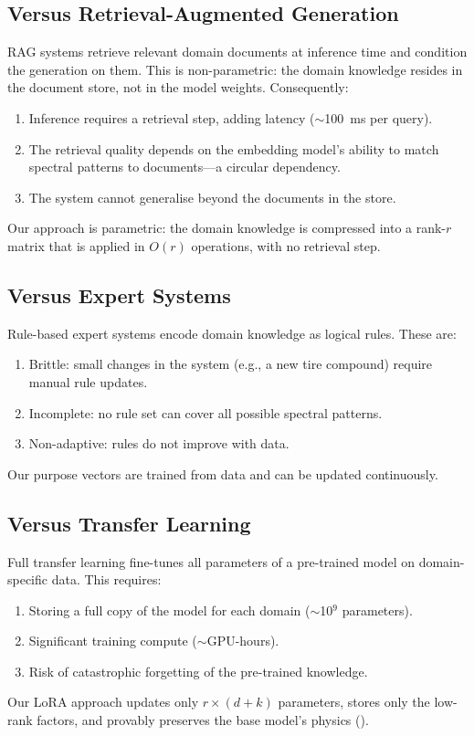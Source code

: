 \documentclass[11pt,twocolumn,a4paper]{article}
\theoremstyle{definition}
\theoremstyle{remark}
\begin{document}
\subsection{Versus Retrieval-Augmented Generation}

RAG systems \citep{gururangan2020dont} retrieve relevant domain documents at inference time and condition the generation on them.  This is non-parametric: the domain knowledge resides in the document store, not in the model weights.  Consequently:
\begin{enumerate}
    \item Inference requires a retrieval step, adding latency ($\sim$100~ms per query).
    \item The retrieval quality depends on the embedding model's ability to match spectral patterns to documents---a circular dependency.
    \item The system cannot generalise beyond the documents in the store.
\end{enumerate}
Our approach is parametric: the domain knowledge is compressed into a rank-$r$ matrix that is applied in $O(r)$ operations, with no retrieval step.

\subsection{Versus Expert Systems}

Rule-based expert systems encode domain knowledge as logical rules.  These are:
\begin{enumerate}
    \item Brittle: small changes in the system (e.g., a new tire compound) require manual rule updates.
    \item Incomplete: no rule set can cover all possible spectral patterns.
    \item Non-adaptive: rules do not improve with data.
\end{enumerate}
Our purpose vectors are trained from data and can be updated continuously.

\subsection{Versus Transfer Learning}

Full transfer learning \citep{gururangan2020dont} fine-tunes all parameters of a pre-trained model on domain-specific data.  This requires:
\begin{enumerate}
    \item Storing a full copy of the model for each domain ($\sim$10$^9$ parameters).
    \item Significant training compute ($\sim$GPU-hours).
    \item Risk of catastrophic forgetting of the pre-trained knowledge.
\end{enumerate}
Our LoRA approach updates only $r \times (d + k)$ parameters, stores only the low-rank factors, and provably preserves the base model's physics ().
\end{document}
